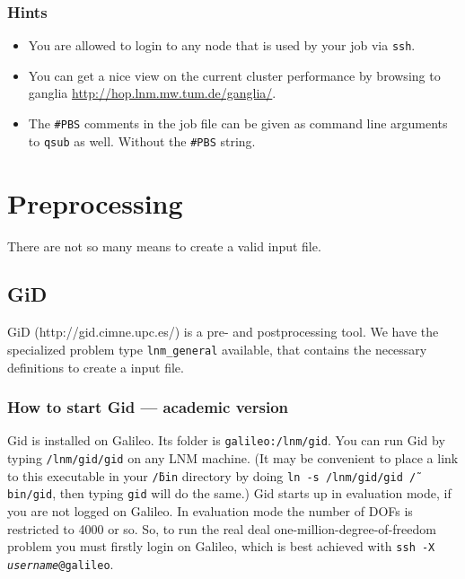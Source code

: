 \subsubsection{Hints}

\begin{itemize}
\item You are allowed to login to any node that is used by your job via
\texttt{ssh}.
\item You can get a nice view on the current cluster performance by browsing
to ganglia \url{http://hop.lnm.mw.tum.de/ganglia/}.
\item The \texttt{\#PBS} comments in the job file can be given as command
line arguments to \texttt{qsub} as well. Without the \texttt{\#PBS}
string.
\end{itemize}

\section{Preprocessing}

There are not so many means to create a valid input file.


\subsection{GiD}\label{beginner:sec:gid}

GiD (http://gid.cimne.upc.es/) is a pre- and postprocessing tool. We have the specialized problem
type \texttt{lnm\_general} available, that contains the necessary
definitions to create a \ccarat{} input file.

\subsubsection{How to start Gid --- academic version}

Gid is installed on Galileo. Its folder is \texttt{galileo:/lnm/gid}.
You can run Gid by typing \texttt{/lnm/gid/gid} on any LNM machine.
(It may be convenient to place a link to this executable in your \texttt{\~{/}bin}
directory by doing \texttt{ln -s /lnm/gid/gid \~{/}bin/gid}, then
typing \texttt{gid} will do the same.) Gid starts up in evaluation
mode, if you are not logged on Galileo. In evaluation mode the number
of DOFs is restricted to 4000 or so. So, to run the real deal one-million-degree-of-freedom
problem you must firstly login on Galileo, which is best achieved
with \texttt{ssh -X} \texttt{\emph{username}}\texttt{@galileo}.

